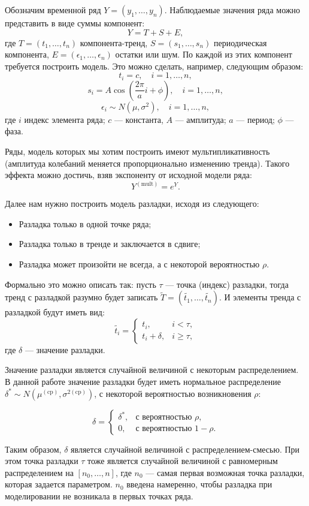 \documentclass[%
12pt,
master,  %
natbib,      %
subf,        %
substylefile = spbu.rtx,
href,        %
colorlinks,  %
]{disser}
\begin{document}
Обозначим временной ряд $Y = (y_1, \dots, y_n)$. Наблюдаемые значения ряда можно представить в виде суммы компонент:
$$ Y = T + S + E ,$$ 
где  $ T = (t_1, \dots, t_n) $ компонента-тренд, $ S = (s_1, \dots, s_n) $ периодическая компонента, $ E = (\epsilon_1, \dots, \epsilon_n) $ остатки или шум.
По каждой из этих компонент требуется построить модель. Это можно сделать, например, следующим образом:
$$ t_i = c, \quad i = 1, \dots, n, $$
$$ s_i = A \cos(\frac{2\pi}{a} i + \phi), \quad i = 1, \dots, n,$$
$$ \epsilon_i \sim N(\mu, \sigma^2), \quad i = 1, \dots, n, $$
где $i$ индекс элемента ряда; $c$ --- константа, $A$ --- амплитуда; $a$ --- период; $\phi$ --- фаза.

Ряды, модель которых мы хотим построить имеют мультипликативность (амплитуда колебаний меняется пропорционально изменению тренда). Такого эффекта можно достичь, взяв экспоненту от исходной модели ряда:
$$ Y^{\mathrm{(mult)}} = e^{Y}. $$

Далее нам нужно построить модель разладки, исходя из следующего:
\begin{itemize}
	\item Разладка только в одной точке ряда;
	\item Разладка только в тренде и заключается в сдвиге;
	\item Разладка может произойти не всегда, а с некоторой вероятностью $\rho$.
\end{itemize}
Формально это можно описать так: пусть $\tau$ --- точка (индекс) разладки, тогда тренд с разладкой разумно будет записать $ \tilde{T} = (\tilde{t_1}, \dots, \tilde{t_n}) $. И элементы тренда с разладкой будут иметь вид:
$$ \tilde{t_i} =
	\begin{cases}
		t_i, & i < \tau, \\
		t_i + \delta, & i \geqslant \tau,
	\end{cases}
$$
где $ \delta $  --- значение разладки.

Значение разладки является случайной величиной с некоторым распределением. В данной работе значение разладки будет иметь нормальное распределение $ \delta^* \sim N(\mu^{\mathrm{(cp)}}, \sigma^{2\mathrm{(cp)}})  $, с некоторой вероятностью возникновения $ \rho $:

$$   
\delta = \begin{cases}
    		\delta^*, & \textrm{с вероятностью } \rho, \\
  		0, & \textrm{с вероятностью } 1 - \rho.
	\end{cases} 
$$

Таким образом, $\delta$ является случайной величиной с распределением-смесью. При этом точка разладки  $\tau$ тоже является случайной величиной с равномерным распределением на $ [n_0, \dots, n ] $, где $ n_0 $ --- самая первая возможная точка разладки, которая задается параметром. $n_0$ введена намеренно, чтобы разладка при моделировании не возникала в первых точках ряда.
\end{document}
